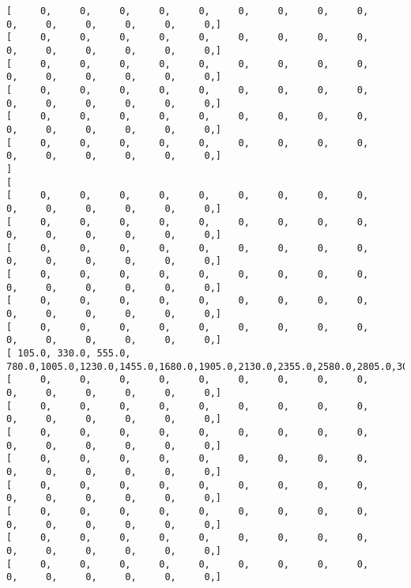 \documentclass[11pt]{article}
\begin{document}
\begin{Verbatim}[commandchars=\\\{\}]
[      0,      0,      0,      0,      0,      0,      0,      0,      0,      0,      0,      0,      0,      0,      0, ]
[      0,      0,      0,      0,      0,      0,      0,      0,      0,      0,      0,      0,      0,      0,      0, ]
[      0,      0,      0,      0,      0,      0,      0,      0,      0,      0,      0,      0,      0,      0,      0, ]
[      0,      0,      0,      0,      0,      0,      0,      0,      0,      0,      0,      0,      0,      0,      0, ]
[      0,      0,      0,      0,      0,      0,      0,      0,      0,      0,      0,      0,      0,      0,      0, ]
[      0,      0,      0,      0,      0,      0,      0,      0,      0,      0,      0,      0,      0,      0,      0, ]
]
[
[      0,      0,      0,      0,      0,      0,      0,      0,      0,      0,      0,      0,      0,      0,      0, ]
[      0,      0,      0,      0,      0,      0,      0,      0,      0,      0,      0,      0,      0,      0,      0, ]
[      0,      0,      0,      0,      0,      0,      0,      0,      0,      0,      0,      0,      0,      0,      0, ]
[      0,      0,      0,      0,      0,      0,      0,      0,      0,      0,      0,      0,      0,      0,      0, ]
[      0,      0,      0,      0,      0,      0,      0,      0,      0,      0,      0,      0,      0,      0,      0, ]
[      0,      0,      0,      0,      0,      0,      0,      0,      0,      0,      0,      0,      0,      0,      0, ]
[  105.0,  330.0,  555.0,  780.0, 1005.0, 1230.0, 1455.0, 1680.0, 1905.0, 2130.0, 2355.0, 2580.0, 2805.0, 3030.0, 3255.0, ]
[      0,      0,      0,      0,      0,      0,      0,      0,      0,      0,      0,      0,      0,      0,      0, ]
[      0,      0,      0,      0,      0,      0,      0,      0,      0,      0,      0,      0,      0,      0,      0, ]
[      0,      0,      0,      0,      0,      0,      0,      0,      0,      0,      0,      0,      0,      0,      0, ]
[      0,      0,      0,      0,      0,      0,      0,      0,      0,      0,      0,      0,      0,      0,      0, ]
[      0,      0,      0,      0,      0,      0,      0,      0,      0,      0,      0,      0,      0,      0,      0, ]
[      0,      0,      0,      0,      0,      0,      0,      0,      0,      0,      0,      0,      0,      0,      0, ]
[      0,      0,      0,      0,      0,      0,      0,      0,      0,      0,      0,      0,      0,      0,      0, ]
[      0,      0,      0,      0,      0,      0,      0,      0,      0,      0,      0,      0,      0,      0,      0, ]

\end{Verbatim}
\end{document}
